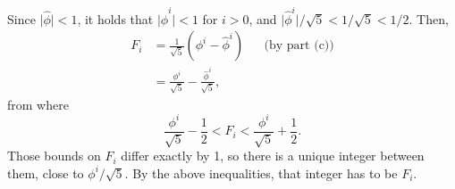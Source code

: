 Since $\bigl|\widehat\phi\bigr|<1$, it holds that $\bigl|\widehat\phi^i\bigr|<1$ for $i>0$, and $\bigl|\widehat\phi^i\bigr|/\!\sqrt{5}<1/\!\sqrt{5}<1/2$.
Then,
\begin{align*}
    F_i &= \frac{1}{\sqrt{5}}(\phi^i-\widehat\phi^i) && \text{(by part (c))} \\
    &= \frac{\phi^i}{\sqrt{5}}-\frac{\widehat\phi^i}{\sqrt{5}},
\end{align*}
from where
\[
    \frac{\phi^i}{\sqrt{5}}-\frac{1}{2} < F_i < \frac{\phi^i}{\sqrt{5}}+\frac{1}{2}.
\]
Those bounds on $F_i$ differ exactly by 1, so there is a unique integer between them, close to $\phi^i/\sqrt{5}$.
By the above inequalities, that integer has to be $F_i$.

